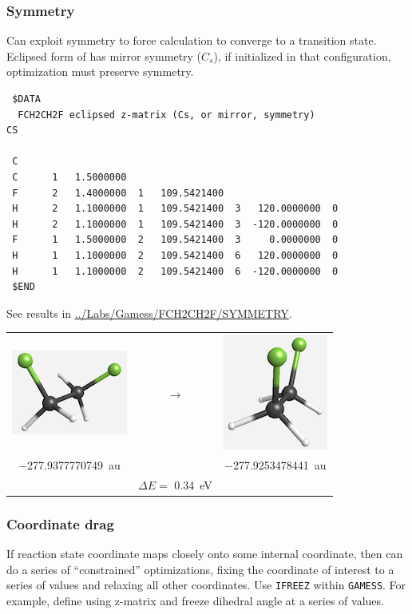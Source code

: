 \documentclass[11pt]{article}
\begin{document}
\subsubsection{Symmetry}
\label{sec:org1210fe1}
Can exploit symmetry to force calculation to converge to a transition state. Eclipsed form of  has mirror symmetry (\(C_s\)), if initialized in that configuration, optimization must preserve symmetry.  

\begin{verbatim}
 $DATA
  FCH2CH2F eclipsed z-matrix (Cs, or mirror, symmetry)
CS

 C   
 C      1   1.5000000
 F      2   1.4000000  1   109.5421400
 H      2   1.1000000  1   109.5421400  3   120.0000000  0
 H      2   1.1000000  1   109.5421400  3  -120.0000000  0
 F      1   1.5000000  2   109.5421400  3     0.0000000  0
 H      1   1.1000000  2   109.5421400  6   120.0000000  0
 H      1   1.1000000  2   109.5421400  6  -120.0000000  0
 $END
\end{verbatim}

See results in \url{../Labs/Gamess/FCH2CH2F/SYMMETRY}.

\begin{center}
\begin{tabular}{ccc}
\includegraphics{./Images/FCH2CH2F-gauche.png}
 & \(\longrightarrow\) & 
\includegraphics{./Images/FCH2CH2F-eclipsed.png} \\
\SI{-277.9377770749}{au} &  & \SI{-277.9253478441}{au} \\
  &  \(\Delta E =\) \SI{0.34}{eV} &  \\
\end{tabular}
\end{center}

\subsubsection{Coordinate drag}
\label{sec:orgefcdfa0}
If reaction state coordinate maps closely onto some internal coordinate, then can do a series of ``constrained'' optimizations, fixing the coordinate of interest to a series of values and relaxing all other coordinates.  Use \texttt{IFREEZ} within \texttt{GAMESS}.  For example, define  using z-matrix and freeze  dihedral angle at a series of values.
\end{document}
